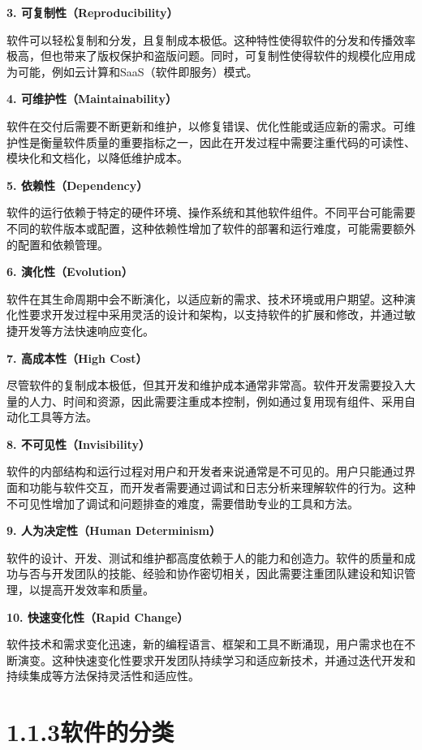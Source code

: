 \documentclass[12pt,a4paper]{ctexbook}
\begin{document}
\textbf{3. 可复制性（Reproducibility）}

软件可以轻松复制和分发，且复制成本极低。这种特性使得软件的分发和传播效率极高，但也带来了版权保护和盗版问题。同时，可复制性使得软件的规模化应用成为可能，例如云计算和SaaS（软件即服务）模式。

\textbf{4. 可维护性（Maintainability）}

软件在交付后需要不断更新和维护，以修复错误、优化性能或适应新的需求。可维护性是衡量软件质量的重要指标之一，因此在开发过程中需要注重代码的可读性、模块化和文档化，以降低维护成本。

\textbf{5. 依赖性（Dependency）}

软件的运行依赖于特定的硬件环境、操作系统和其他软件组件。不同平台可能需要不同的软件版本或配置，这种依赖性增加了软件的部署和运行难度，可能需要额外的配置和依赖管理。

\textbf{6. 演化性（Evolution）}

软件在其生命周期中会不断演化，以适应新的需求、技术环境或用户期望。这种演化性要求开发过程中采用灵活的设计和架构，以支持软件的扩展和修改，并通过敏捷开发等方法快速响应变化。

\textbf{7. 高成本性（High Cost）}

尽管软件的复制成本极低，但其开发和维护成本通常非常高。软件开发需要投入大量的人力、时间和资源，因此需要注重成本控制，例如通过复用现有组件、采用自动化工具等方法。

\textbf{8. 不可见性（Invisibility）}

软件的内部结构和运行过程对用户和开发者来说通常是不可见的。用户只能通过界面和功能与软件交互，而开发者需要通过调试和日志分析来理解软件的行为。这种不可见性增加了调试和问题排查的难度，需要借助专业的工具和方法。

\textbf{9. 人为决定性（Human Determinism）}

软件的设计、开发、测试和维护都高度依赖于人的能力和创造力。软件的质量和成功与否与开发团队的技能、经验和协作密切相关，因此需要注重团队建设和知识管理，以提高开发效率和质量。

\textbf{10. 快速变化性（Rapid Change）}

软件技术和需求变化迅速，新的编程语言、框架和工具不断涌现，用户需求也在不断演变。这种快速变化性要求开发团队持续学习和适应新技术，并通过迭代开发和持续集成等方法保持灵活性和适应性。


\section{1.1.3软件的分类}\label{ux8f6fux4ef6ux7684ux5206ux7c7b}
\end{document}
